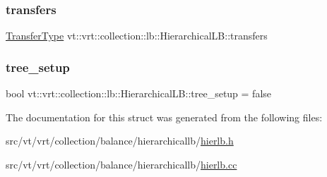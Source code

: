 \subsubsection{\texorpdfstring{transfers}{transfers}}
{\footnotesize\ttfamily \hyperlink{structvt_1_1vrt_1_1collection_1_1lb_1_1_base_l_b_a0a5f834082d85c558bdaf84c464c1ead}{Transfer\+Type} vt\+::vrt\+::collection\+::lb\+::\+Hierarchical\+L\+B\+::transfers\hspace{0.3cm}{\ttfamily [private]}}

\mbox{\label{structvt_1_1vrt_1_1collection_1_1lb_1_1_hierarchical_l_b_abd4e7b54c632de1dc2f2751676328f3d}} 
\subsubsection{\texorpdfstring{tree\+\_\+setup}{tree\_setup}}
{\footnotesize\ttfamily bool vt\+::vrt\+::collection\+::lb\+::\+Hierarchical\+L\+B\+::tree\+\_\+setup = false\hspace{0.3cm}{\ttfamily [private]}}



The documentation for this struct was generated from the following files\+:\begin{DoxyCompactItemize}
\item 
src/vt/vrt/collection/balance/hierarchicallb/\hyperlink{hierlb_8h}{hierlb.\+h}\item 
src/vt/vrt/collection/balance/hierarchicallb/\hyperlink{hierlb_8cc}{hierlb.\+cc}\end{DoxyCompactItemize}
